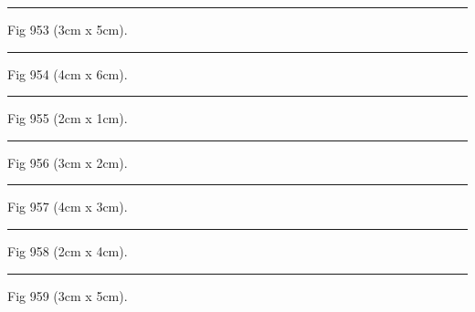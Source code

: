 \documentclass[a4paper,11pt]{article}
\begin{document}
\begin{swarmwrap}%
  \begin{minipage}[t]{3cm}
    \centering
    \rule{\linewidth}{5cm}
    {\footnotesize Fig 953 (3cm x 5cm).}
  \end{minipage}%
\end{swarmwrap}%
\swarmwrapnext
\lipsum[53]%

\begin{swarmwrap}%
  \begin{minipage}[t]{4cm}
    \centering
    \rule{\linewidth}{6cm}
    {\footnotesize Fig 954 (4cm x 6cm).}
  \end{minipage}%
\end{swarmwrap}%
\swarmwrapnext
\lipsum[54]%

\begin{swarmwrap}%
  \begin{minipage}[t]{2cm}
    \centering
    \rule{\linewidth}{1cm}
    {\footnotesize Fig 955 (2cm x 1cm).}
  \end{minipage}%
\end{swarmwrap}%
\swarmwrapnext
\lipsum[55]%

\begin{swarmwrap}%
  \begin{minipage}[t]{3cm}
    \centering
    \rule{\linewidth}{2cm}
    {\footnotesize Fig 956 (3cm x 2cm).}
  \end{minipage}%
\end{swarmwrap}%
\swarmwrapnext
\lipsum[56]%

\begin{swarmwrap}%
  \begin{minipage}[t]{4cm}
    \centering
    \rule{\linewidth}{3cm}
    {\footnotesize Fig 957 (4cm x 3cm).}
  \end{minipage}%
\end{swarmwrap}%
\swarmwrapnext
\lipsum[57]%

\begin{swarmwrap}%
  \begin{minipage}[t]{2cm}
    \centering
    \rule{\linewidth}{4cm}
    {\footnotesize Fig 958 (2cm x 4cm).}
  \end{minipage}%
\end{swarmwrap}%
\swarmwrapnext
\lipsum[58]%

\begin{swarmwrap}%
  \begin{minipage}[t]{3cm}
    \centering
    \rule{\linewidth}{5cm}
    {\footnotesize Fig 959 (3cm x 5cm).}
  \end{minipage}%
\end{swarmwrap}%
\swarmwrapnext
\lipsum[59]%
\end{document}
